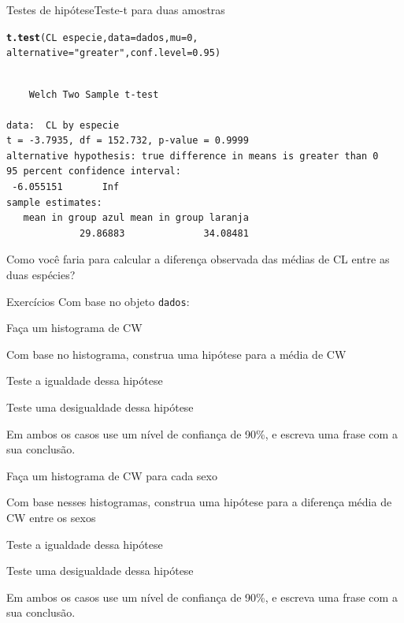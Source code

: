 \documentclass[10pt]{beamer}\usepackage[]{graphicx}\usepackage[]{color}
\makeatletter
\newcommand{\hlnum}[1]{\textcolor[rgb]{0.686,0.059,0.569}{#1}}%
\newcommand{\hlstr}[1]{\textcolor[rgb]{0.192,0.494,0.8}{#1}}%
\newcommand{\hlopt}[1]{\textcolor[rgb]{0,0,0}{#1}}%
\newcommand{\hlstd}[1]{\textcolor[rgb]{0.345,0.345,0.345}{#1}}%
\newcommand{\hlkwc}[1]{\textcolor[rgb]{0.333,0.667,0.333}{#1}}%
\newcommand{\hlkwd}[1]{\textcolor[rgb]{0.737,0.353,0.396}{\textbf{#1}}}%
\newenvironment{kframe}{%
 \def\at@end@of@kframe{}%
 \ifinner\ifhmode%
  \def\at@end@of@kframe{\end{minipage}}%
  \begin{minipage}{\columnwidth}%
 \fi\fi%
 \def\FrameCommand##1{\hskip\@totalleftmargin \hskip-\fboxsep
 \colorbox{shadecolor}{##1}\hskip-\fboxsep
     \hskip-\linewidth \hskip-\@totalleftmargin \hskip\columnwidth}%
 \MakeFramed {\advance\hsize-\width
   \@totalleftmargin\z@ \linewidth\hsize
   \@setminipage}}%
 {\par\unskip\endMakeFramed%
 \at@end@of@kframe}
\newenvironment{knitrout}{}{} %
\theoremstyle{definition}
\makeatother
\begin{document}
\begin{frame}[fragile=singleslide]{Testes de hipótese}{Teste-t para duas amostras}
\begin{knitrout}\small
{}\color{fgcolor}\begin{kframe}
\begin{alltt}
\hlkwd{t.test}\hlstd{(CL} \hlopt{~} \hlstd{especie,} \hlkwc{data} \hlstd{= dados,} \hlkwc{mu} \hlstd{=} \hlnum{0}\hlstd{,}
       \hlkwc{alternative} \hlstd{=} \hlstr{"greater"}\hlstd{,} \hlkwc{conf.level} \hlstd{=} \hlnum{0.95}\hlstd{)}
\end{alltt}
\begin{verbatim}

	Welch Two Sample t-test

data:  CL by especie
t = -3.7935, df = 152.732, p-value = 0.9999
alternative hypothesis: true difference in means is greater than 0
95 percent confidence interval:
 -6.055151       Inf
sample estimates:
   mean in group azul mean in group laranja 
             29.86883              34.08481 
\end{verbatim}
\end{kframe}
\end{knitrout}
Como você faria para calcular a diferença observada das médias de CL
entre as duas espécies?
\end{frame}

\begin{frame}[fragile=singleslide]{Exercícios}
Com base no objeto \texttt{dados}:
  \begin{compactenum}[(1)]
  \item Faça um histograma de CW
  \item Com base no histograma, construa uma hipótese para a média de CW
    \begin{compactenum}[(a)]
    \item Teste a igualdade dessa hipótese
    \item Teste uma desigualdade dessa hipótese
    \end{compactenum}
    Em ambos os casos use um nível de confiança de 90\%, e escreva uma
    frase com a sua conclusão.
  \item Faça um histograma de CW para cada sexo
  \item Com base nesses histogramas, construa uma hipótese para a
    diferença média de CW entre os sexos
    \begin{compactenum}[(a)]
    \item Teste a igualdade dessa hipótese
    \item Teste uma desigualdade dessa hipótese
    \end{compactenum}
    Em ambos os casos use um nível de confiança de 90\%, e escreva uma
    frase com a sua conclusão.
  \end{compactenum}
\end{frame}
\end{document}
